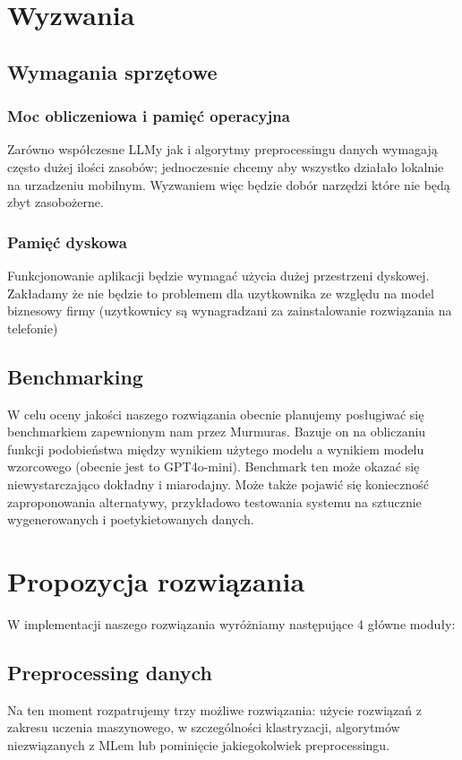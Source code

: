 \documentclass[12pt]{article}
\begin{document}
\section*{Wyzwania}

\subsection*{Wymagania sprzętowe}
\subsubsection*{Moc obliczeniowa i pamięć operacyjna}
Zarówno współczesne LLMy jak i algorytmy preprocessingu danych wymagają często dużej ilości zasobów; jednoczesnie chcemy aby wszystko działało lokalnie na urzadzeniu mobilnym. Wyzwaniem więc będzie dobór narzędzi które nie będą zbyt zasobożerne.

\subsubsection*{Pamięć dyskowa}
Funkcjonowanie aplikacji będzie wymagać użycia dużej przestrzeni dyskowej. Zakładamy że nie będzie to problemem dla uzytkownika ze względu na model biznesowy firmy (uzytkownicy są wynagradzani za zainstalowanie rozwiązania na telefonie)

\subsection*{Benchmarking}
W celu oceny jakości naszego rozwiązania obecnie planujemy posługiwać się benchmarkiem zapewnionym nam przez Murmuras.
Bazuje on na obliczaniu funkcji podobieństwa między wynikiem użytego modelu a wynikiem modelu wzorcowego (obecnie jest to GPT4o-mini).
Benchmark ten może okazać się niewystarczająco dokładny i miarodajny. Może także pojawić się konieczność zaproponowania alternatywy, przykładowo testowania systemu na sztucznie wygenerowanych i poetykietowanych danych.

\section*{Propozycja rozwiązania}
W implementacji naszego rozwiązania wyróżniamy następujące 4 główne moduły:
\subsection*{Preprocessing danych}
Na ten moment rozpatrujemy trzy możliwe rozwiązania: użycie rozwiązań z zakresu uczenia maszynowego, w szczególności klastryzacji, algorytmów niezwiązanych z MLem lub pominięcie jakiegokolwiek preprocessingu.
\end{document}
